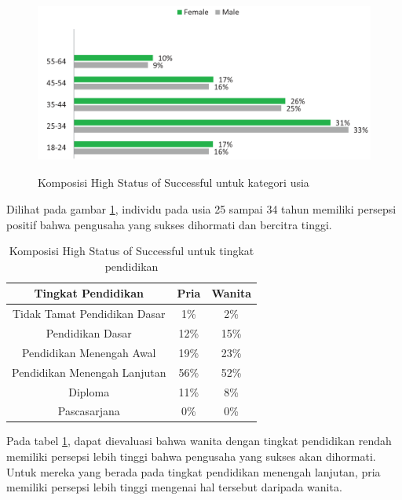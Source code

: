 \begin{enumerate}
\begin{figure} [H]
	\centering  
	\includegraphics[width=14cm, height=6cm]{umurHS2013} 
	\caption[Komposisi High Status of Successful untuk kategori usia]{Komposisi High Status of Successful untuk kategori usia} 
	\label{fig:umurHS} 
\end{figure} 

Dilihat pada gambar \ref{fig:umurHS}, individu pada usia 25 sampai 34 tahun memiliki persepsi positif bahwa pengusaha yang sukses dihormati dan bercitra tinggi.

\begin{table} [H]
\centering
\caption{Komposisi High Status of Successful untuk tingkat pendidikan}
\begin{tabular}{|c|c|c|}
\hline
Tingkat Pendidikan & Pria & Wanita\\
\hline
Tidak Tamat Pendidikan Dasar & 1\% & 2\%\\
\hline
Pendidikan Dasar & 12\% & 15\%\\
\hline
Pendidikan Menengah Awal & 19\% & 23\%\\
\hline
Pendidikan Menengah Lanjutan & 56\% & 52\%\\
\hline
Diploma & 11\% & 8\%\\
\hline
Pascasarjana & 0\% & 0\%\\
\hline
\end{tabular}
\label{pendidikanHS}
\end{table}

Pada tabel \ref{pendidikanHS}, dapat dievaluasi bahwa wanita dengan tingkat pendidikan rendah memiliki persepsi lebih tinggi bahwa pengusaha yang sukses akan dihormati. Untuk mereka yang berada pada tingkat pendidikan menengah lanjutan, pria memiliki persepsi lebih tinggi mengenai hal tersebut daripada wanita.


\end{enumerate}
